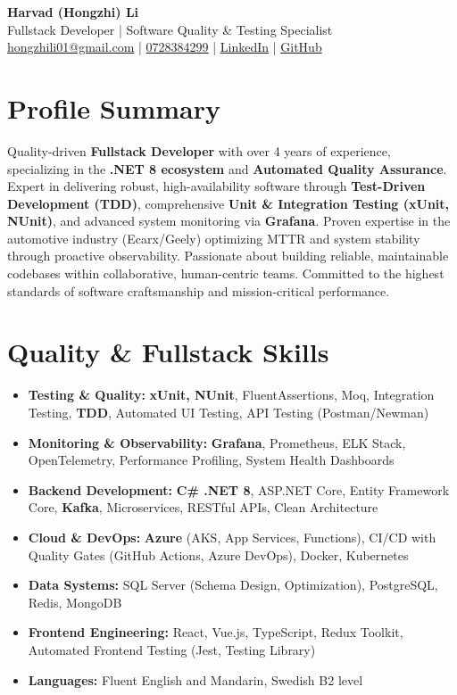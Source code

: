 \documentclass[11pt,a4paper]{article}
\begin{document}
\pagestyle{empty}

\begin{center}
{\LARGE \textbf{Harvad (Hongzhi) Li}}\\[10pt]
{\Large Fullstack Developer | Software Quality \& Testing Specialist}\\[10pt]
\textcolor{linkedinblue}{\href{mailto:hongzhili01@gmail.com}{hongzhili01@gmail.com} | \href{tel:0728384299}{0728384299} | \href{https://www.linkedin.com/in/harvad/}{LinkedIn} | \href{https://github.com/bluehawana}{GitHub}}
\end{center}

\section*{Profile Summary}

Quality-driven \textbf{Fullstack Developer} with over 4 years of experience, specializing in the \textbf{.NET 8 ecosystem} and \textbf{Automated Quality Assurance}. Expert in delivering robust, high-availability software through \textbf{Test-Driven Development (TDD)}, comprehensive \textbf{Unit \& Integration Testing (xUnit, NUnit)}, and advanced system monitoring via \textbf{Grafana}. Proven expertise in the automotive industry (Ecarx/Geely) optimizing MTTR and system stability through proactive observability. Passionate about building reliable, maintainable codebases within collaborative, human-centric teams. Committed to the highest standards of software craftsmanship and mission-critical performance.

\section*{Quality \& Fullstack Skills}
\begin{itemize}[leftmargin=*, itemsep=2pt]
\item \textbf{Testing \& Quality:} \textbf{xUnit, NUnit}, FluentAssertions, Moq, Integration Testing, \textbf{TDD}, Automated UI Testing, API Testing (Postman/Newman)
\item \textbf{Monitoring \& Observability:} \textbf{Grafana}, Prometheus, ELK Stack, OpenTelemetry, Performance Profiling, System Health Dashboards
\item \textbf{Backend Development:} \textbf{C\# .NET 8}, ASP.NET Core, Entity Framework Core, \textbf{Kafka}, Microservices, RESTful APIs, Clean Architecture
\item \textbf{Cloud \& DevOps:} \textbf{Azure} (AKS, App Services, Functions), CI/CD with Quality Gates (GitHub Actions, Azure DevOps), Docker, Kubernetes
\item \textbf{Data Systems:} SQL Server (Schema Design, Optimization), PostgreSQL, Redis, MongoDB
\item \textbf{Frontend Engineering:} React, Vue.js, TypeScript, Redux Toolkit, Automated Frontend Testing (Jest, Testing Library)
\item \textbf{Languages:} Fluent English and Mandarin, Swedish B2 level
\end{itemize}
\end{document}
